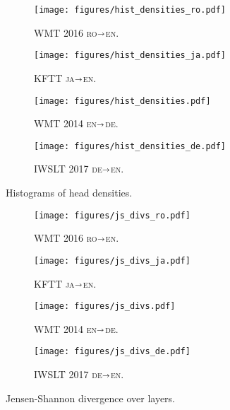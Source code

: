 \documentclass[11pt,a4paper]{article}
\newcommand{\langp}[2]{\textsc{#1}$\shortrightarrow$\textsc{#2}}
\begin{document}
\begin{figure}[h!]
    \centering
    \begin{subfigure}[b]{.47\linewidth}
    \texttt{[image: figures/hist\_densities\_ro.pdf]}
    \caption{\label{fig:hist_densities_ro}WMT 2016 \langp{ro}{en}.}
\end{subfigure}
\begin{subfigure}[b]{.47\linewidth}
    \texttt{[image: figures/hist\_densities\_ja.pdf]}
    \caption{\label{fig:hist_densities_ja}KFTT \langp{ja}{en}.}
\end{subfigure}

\begin{subfigure}[b]{.47\linewidth}
    \texttt{[image: figures/hist\_densities.pdf]}
    \caption{\label{fig:hist_densities_en}WMT 2014 \langp{en}{de}.}
\end{subfigure}
\begin{subfigure}[b]{.47\linewidth}
    \texttt{[image: figures/hist\_densities\_de.pdf]}
    \caption{\label{fig:hist_densities_de}IWSLT 2017 \langp{de}{en}.}
\end{subfigure}
\caption{Histograms of head densities.}
\label{fig:hist_densities_lps}
\end{figure}

\begin{figure}[h!]
    \centering
    \begin{subfigure}[b]{.47\linewidth}
    \texttt{[image: figures/js\_divs\_ro.pdf]}
    \caption{\label{fig:js_divs_ro}WMT 2016 \langp{ro}{en}.}
\end{subfigure}
\begin{subfigure}[b]{.47\linewidth}
    \texttt{[image: figures/js\_divs\_ja.pdf]}
    \caption{\label{fig:js_divs_ja}KFTT \langp{ja}{en}.}
\end{subfigure}

\begin{subfigure}[b]{.47\linewidth}
    \texttt{[image: figures/js\_divs.pdf]}
    \caption{\label{fig:js_divs_en}WMT 2014 \langp{en}{de}.}
\end{subfigure}
\begin{subfigure}[b]{.47\linewidth}
    \texttt{[image: figures/js\_divs\_de.pdf]}
    \caption{\label{fig:js_divs_de}IWSLT 2017 \langp{de}{en}.}
\end{subfigure}
\caption{Jensen-Shannon divergence over layers.}
\label{fig:js_divs_lps}
\end{figure}
\end{document}
